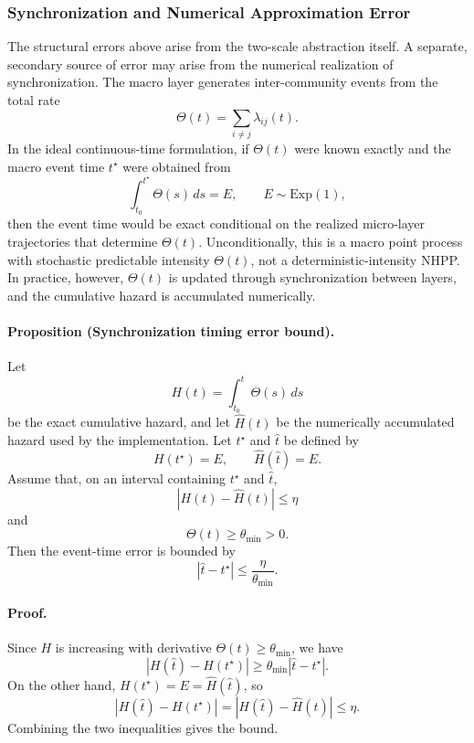 \documentclass[a4paper,fleqn]{cas-sc}
\newcommand{\ReadStatusTwo}[5]{}
\begin{document}
\subsubsection{Synchronization and Numerical Approximation Error}
\ReadStatusTwo{Synchronization and Numerical Approximation Error}{Yulian}{1}{Michael}{0}

The structural errors above arise from the two-scale abstraction itself. A separate, secondary source of error may arise from the numerical realization of synchronization. The macro layer generates inter-community events from the total rate
\[
\Theta(t)
=
\sum_{i\neq j}
\lambda_{ij}(t).
\]
In the ideal continuous-time formulation, if \(\Theta(t)\) were known exactly and the macro event time \(t^\star\) were obtained from
\[
\int_{t_0}^{t^\star}
\Theta(s)\,ds
=
E,
\qquad
E\sim \mathrm{Exp}(1),
\]
then the event time would be exact conditional on the realized micro-layer trajectories that determine \(\Theta(t)\). Unconditionally, this is a macro point process with stochastic predictable intensity \(\Theta(t)\), not a deterministic-intensity NHPP. In practice, however, \(\Theta(t)\) is updated through synchronization between layers, and the cumulative hazard is accumulated numerically.

\paragraph{Proposition (Synchronization timing error bound).}
Let
\[
H(t)
=
\int_{t_0}^{t}
\Theta(s)\,ds
\]
be the exact cumulative hazard, and let \(\widehat{H}(t)\) be the numerically accumulated hazard used by the implementation. Let \(t^\star\) and \(\widehat{t}\) be defined by
\[
H(t^\star)=E,
\qquad
\widehat{H}(\widehat{t})=E.
\]
Assume that, on an interval containing \(t^\star\) and \(\widehat{t}\),
\[
|H(t)-\widehat{H}(t)|\le \eta
\]
and
\[
\Theta(t)\ge \theta_{\min}>0.
\]
Then the event-time error is bounded by
\[
|\widehat{t}-t^\star|
\le
\frac{\eta}{\theta_{\min}}.
\]

\paragraph{Proof.}
Since \(H\) is increasing with derivative \(\Theta(t)\ge\theta_{\min}\), we have
\[
|H(\widehat{t})-H(t^\star)|
\ge
\theta_{\min}|\widehat{t}-t^\star|.
\]
On the other hand, \(H(t^\star)=E=\widehat{H}(\widehat{t})\), so
\[
|H(\widehat{t})-H(t^\star)|
=
|H(\widehat{t})-\widehat{H}(\widehat{t})|
\le \eta.
\]
Combining the two inequalities gives the bound.
\end{document}
